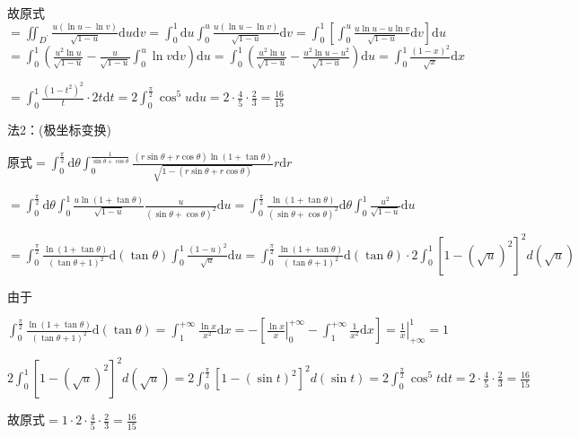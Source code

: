 \begin{xiti}
\begin{solution}
		故原式$=\iint_{D^{\prime}} \frac{u(\ln u-\ln v)}{\sqrt{1-u}} \mathrm{d}u \mathrm{d}v=\int_{0}^{1} \mathrm{d}u \int_{0}^{u} \frac{u(\ln u-\ln v)}{\sqrt{1-u}} \mathrm{d}v=\int_{0}^{1}\left[\int_{0}^{u} \frac{u \ln u-u \ln v}{\sqrt{1-u}} \mathrm{d}v\right] \mathrm{d}u$
		$=\int_{0}^{1}\left(\frac{u^{2} \ln u}{\sqrt{1-u}}-\frac{u}{\sqrt{1-u}} \int_{0}^{u} \ln v \mathrm{d}v\right) \mathrm{d}u=\int_{0}^{1}\left(\frac{u^{2} \ln u}{\sqrt{1-u}}-\frac{u^{2} \ln u-u^{2}}{\sqrt{1-u}}\right) \mathrm{d}u=\int_{0}^{1} \frac{(1-x)^{2}}{\sqrt{x}} \mathrm{d}x$
		
		$=\int_{0}^{1} \frac{\left(1-t^{2}\right)^{2}}{t} \cdot 2 t \mathrm{d}t=2 \int_{0}^{\frac{\pi}{2}} \cos ^{5} u \mathrm{d}u=2 \cdot \frac{4}{5} \cdot \frac{2}{3}=\frac{16}{15}$
		
		法2：(极坐标变换)
		
		原式$=\int_{0}^{\frac{\pi}{2}} \mathrm{d}\theta \int_{0}^{\frac{1}{\sin \theta+\cos \theta}} \frac{(r \sin \theta+r \cos \theta) \ln (1+\tan \theta)}{\sqrt{1-(r \sin \theta+r \cos \theta)}} r \mathrm{d}r$
		
		$=\int_{0}^{\frac{\pi}{2}} \mathrm{d}\theta \int_{0}^{1} \frac{u \ln (1+\tan \theta)}{\sqrt{1-u}} \frac{u}{(\sin \theta+\cos \theta)^{2}} \mathrm{d}u=\int_{0}^{\frac{\pi}{2}} \frac{\ln (1+\tan \theta)}{(\sin \theta+\cos \theta)^{2}} \mathrm{d}\theta \int_{0}^{1} \frac{u^{2}}{\sqrt{1-u}} \mathrm{d}u$
		
		$=\int_{0}^{\frac{\pi}{2}} \frac{\ln (1+\tan \theta)}{(\tan \theta+1)^{2}} \mathrm{d}(\tan \theta) \int_{0}^{1} \frac{(1-u)^{2}}{\sqrt{u}} \mathrm{d}u=\int_{0}^{\frac{\pi}{2}} \frac{\ln (1+\tan \theta)}{(\tan \theta+1)^{2}} \mathrm{d}(\tan \theta) \cdot 2 \int_{0}^{1}\left[1-(\sqrt{u})^{2}\right]^{2} d(\sqrt{u})$
		
		由于
		
		$\int_{0}^{\frac{\pi}{2}} \frac{\ln (1+\tan \theta)}{(\tan \theta+1)^{2}} \mathrm{d}(\tan \theta)=\int_{1}^{+\infty} \frac{\ln x}{x^{2}} \mathrm{d} x=-\left[\left.\frac{\ln x}{x}\right|_{0} ^{+\infty}-\int_{1}^{+\infty} \frac{1}{x^{2}} \mathrm{d} x\right]=\left.\frac{1}{x}\right|_{+\infty} ^{1}=1$
		
		$2 \int_{0}^{1}\left[1-(\sqrt{u})^{2}\right]^{2} d(\sqrt{u})=2 \int_{0}^{\frac{\pi}{2}}\left[1-(\sin t)^{2}\right]^{2} d(\sin t)=2 \int_{0}^{\frac{\pi}{2}} \cos ^{5} t \mathrm{d}t=2 \cdot \frac{4}{5} \cdot \frac{2}{3}=\frac{16}{15}$
		
		故原式$=1 \cdot 2 \cdot \frac{4}{5} \cdot \frac{2}{3}=\frac{16}{15}$
		

\end{solution}
\end{xiti}
